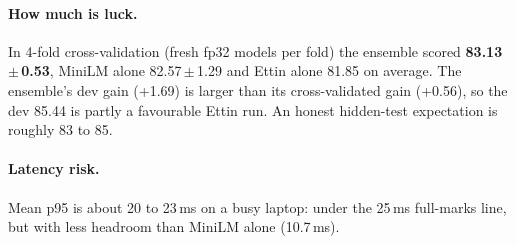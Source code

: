 \documentclass[10pt,a4paper]{article}
\begin{document}
\paragraph{How much is luck.} In 4-fold cross-validation (fresh fp32 models per fold) the
ensemble scored \textbf{83.13\,$\pm$\,0.53}, MiniLM alone 82.57\,$\pm$\,1.29 and Ettin alone
81.85 on average. The ensemble's dev gain (+1.69) is larger than its cross-validated gain
(+0.56), so the dev 85.44 is partly a favourable Ettin run. An honest hidden-test
expectation is roughly 83 to 85.

\paragraph{Latency risk.} Mean p95 is about 20 to 23\,ms on a busy laptop: under the 25\,ms
full-marks line, but with less headroom than MiniLM alone (10.7\,ms).
\end{document}
